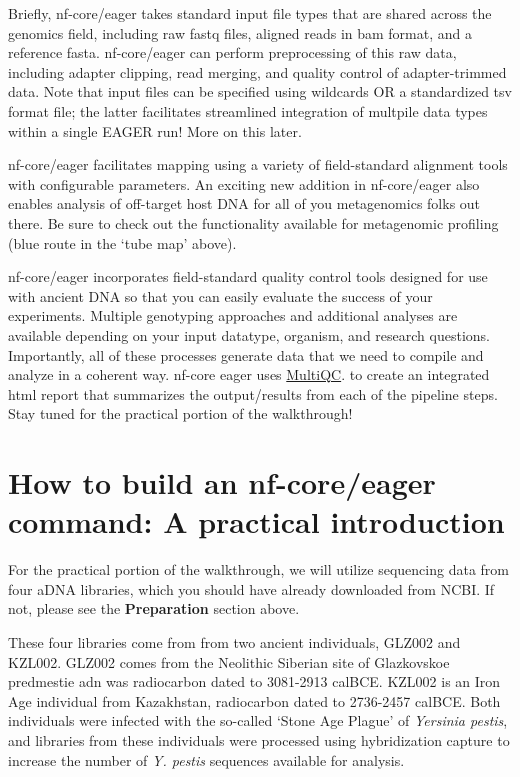 \documentclass[
  letterpaper,
]{book}
\begin{document}
Briefly, nf-core/eager takes standard input file types that are shared
across the genomics field, including raw fastq files, aligned reads in
bam format, and a reference fasta. nf-core/eager can perform
preprocessing of this raw data, including adapter clipping, read
merging, and quality control of adapter-trimmed data. Note that input
files can be specified using wildcards OR a standardized tsv format
file; the latter facilitates streamlined integration of multpile data
types within a single EAGER run! More on this later.

nf-core/eager facilitates mapping using a variety of field-standard
alignment tools with configurable parameters. An exciting new addition
in nf-core/eager also enables analysis of off-target host DNA for all of
you metagenomics folks out there. Be sure to check out the functionality
available for metagenomic profiling (blue route in the `tube map'
above).

nf-core/eager incorporates field-standard quality control tools designed
for use with ancient DNA so that you can easily evaluate the success of
your experiments. Multiple genotyping approaches and additional analyses
are available depending on your input datatype, organism, and research
questions. Importantly, all of these processes generate data that we
need to compile and analyze in a coherent way. nf-core eager uses
\href{https://multiqc.info/}{MultiQC}. to create an integrated html
report that summarizes the output/results from each of the pipeline
steps. Stay tuned for the practical portion of the walkthrough!

\hypertarget{how-to-build-an-nf-coreeager-command-a-practical-introduction}{%
\section{How to build an nf-core/eager command: A practical
introduction}\label{how-to-build-an-nf-coreeager-command-a-practical-introduction}}

For the practical portion of the walkthrough, we will utilize sequencing
data from four aDNA libraries, which you should have already downloaded
from NCBI. If not, please see the \textbf{Preparation} section above.

These four libraries come from from two ancient individuals, GLZ002 and
KZL002. GLZ002 comes from the Neolithic Siberian site of Glazkovskoe
predmestie adn was radiocarbon dated to 3081-2913 calBCE. KZL002 is an
Iron Age individual from Kazakhstan, radiocarbon dated to 2736-2457
calBCE. Both individuals were infected with the so-called `Stone Age
Plague' of \emph{Yersinia pestis}, and libraries from these individuals
were processed using hybridization capture to increase the number of
\emph{Y. pestis} sequences available for analysis.
\end{document}
